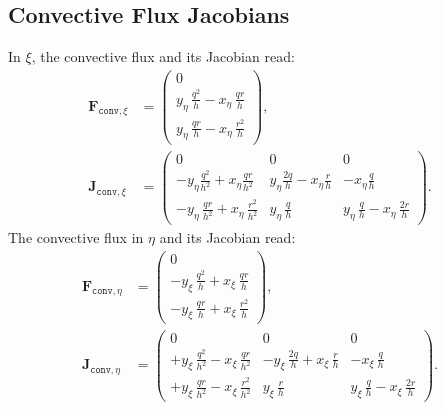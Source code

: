 {{\subsection{Convective Flux Jacobians}
In $\xi$, the convective flux and its Jacobian read:
%
\begin{align}
	\mathbf{F}_{\texttt{conv},\xi}&=
	\begin{pmatrix}
		0\\
		y_{\eta}\, \frac{q^2}{h} - x_{\eta}\, \frac{q r}{h}\\
		y_{\eta}\, \frac{q r}{h} - x_{\eta}\, \frac{r^2}{h}
	\end{pmatrix},
    \\
	\mathbf{J}_{\texttt{conv},\xi}&=
	\begin{pmatrix}
		0 & 0 & 0\\
		-y_{\eta}\frac{q^2}{h^2} + x_{\eta} \frac{qr}{h^2}
		& y_{\eta}\frac{2q}{h} - x_{\eta} \frac{r}{h}
		& - x_{\eta} \frac{q}{h}\\
		-y_{\eta}\, \frac{q r}{h^2} + x_{\eta}\, \frac{r^2}{h^2}
		& y_{\eta}\, \frac{q}{h}
		& y_{\eta}\, \frac{q}{h} - x_{\eta}\, \frac{2r}{h}
	\end{pmatrix}.
\end{align}
%
The convective flux in $\eta$ and its Jacobian read:
%
\begin{align}
	\mathbf{F}_{\texttt{conv},\eta}&=
	\begin{pmatrix}
		0\\
		-y_{\xi}\, \frac{q^2}{h} + x_{\xi}\, \frac{q r}{h}\\
		-y_{\xi}\, \frac{q r}{h} + x_{\xi}\, \frac{r^2}{h}
	\end{pmatrix},
    \\
	\mathbf{J}_{\texttt{conv},\eta}&=
	\begin{pmatrix}
		0 & 0 & 0\\
		+y_{\xi}\, \frac{q^2}{h^2} - x_{\xi}\, \frac{q r}{h^2}
		&-y_{\xi}\, \frac{2q}{h} + x_{\xi}\, \frac{r}{h}
		& - x_{\xi}\, \frac{q}{h}\\
		+y_{\xi}\, \frac{q r}{h^2} - x_{\xi}\, \frac{r^2}{h^2}
		& y_{\xi}\, \frac{r}{h}
		& y_{\xi}\, \frac{q}{h} - x_{\xi}\, \frac{2r}{h}
	\end{pmatrix}.
\end{align}

}}
